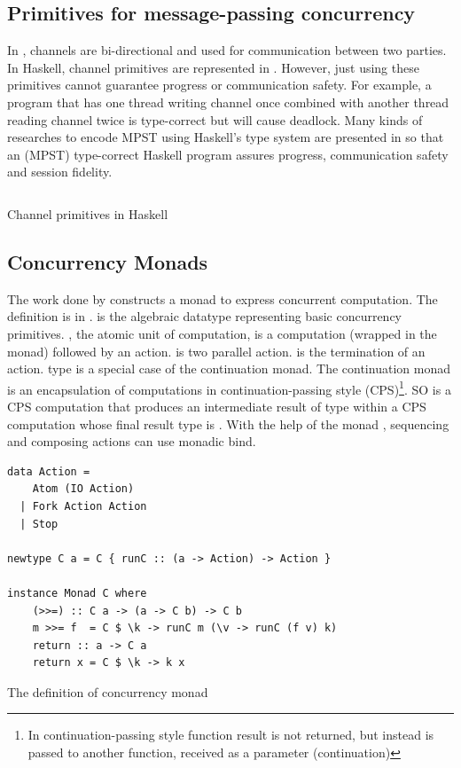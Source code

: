 \subsection{Primitives for message-passing concurrency} \label{b:mo:mpc}
In , channels are bi-directional and used for communication between two parties. In Haskell, channel primitives are represented in . However, just using these primitives cannot guarantee progress or communication safety. For example, a program that has one thread writing channel once combined with another thread reading channel twice is type-correct but will cause deadlock. Many kinds of researches to encode MPST using Haskell's type system are presented in \cite{orchardSessionTypesLinearity2017} so that an (MPST) type-correct Haskell program assures progress, communication safety and session fidelity.
\begin{listing}[ht]
  \inputminted{haskell}{background/mo-chan.hs}
  \caption{Channel primitives in Haskell}
  \label{b:mo:c1}
\end{listing}
\subsection{Concurrency Monads}
The work done by \cite{claessenPoorManConcurrency1999} constructs a monad to express concurrent computation. The definition is in .  is the algebraic datatype representing basic concurrency primitives. , the atomic unit of computation, is a computation (wrapped in the  monad) followed by an action.  is two parallel action.  is the termination of an action. type  is a special case of the continuation monad. The continuation monad is an encapsulation of computations in continuation-passing style (CPS)\footnote{In continuation-passing style function result is not returned, but instead is passed to another function, received as a parameter (continuation)\cite{ControlMonadCont}}. SO  is a CPS computation that produces an intermediate result of type  within a CPS computation whose final result type is . With the help of the monad , sequencing and composing actions can use monadic bind.
\begin{listing}[ht]
  \begin{verbatim}
data Action =
    Atom (IO Action)
  | Fork Action Action
  | Stop

newtype C a = C { runC :: (a -> Action) -> Action }
    
instance Monad C where
    (>>=) :: C a -> (a -> C b) -> C b
    m >>= f  = C $ \k -> runC m (\v -> runC (f v) k)
    return :: a -> C a
    return x = C $ \k -> k x
  \end{verbatim}
  \caption{The definition of concurrency monad}
  \label{b:mo:def}
\end{listing}



